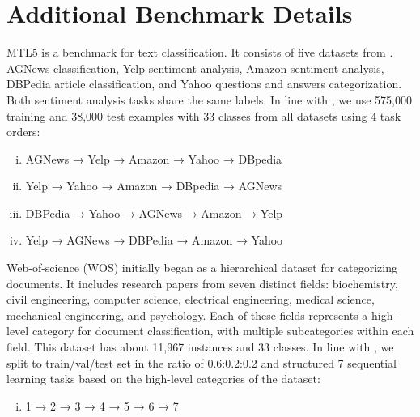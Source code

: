 \documentclass[11pt]{article}
\begin{document}
\clearpage

\appendix

\section{Additional Benchmark Details}
\label{sec:appendix:data}

MTL5 is a benchmark for text classification. It consists of five datasets from \citep{NIPS2015_250cf8b5}. AGNews classification, Yelp sentiment analysis, Amazon sentiment analysis, DBPedia article classification, and Yahoo questions and answers categorization. Both sentiment analysis tasks share the same labels. In line with \citet{NEURIPS2019_f8d2e80c}, we use 575,000 training and 38,000 test examples with 33 classes from all datasets using 4 task orders:

\begin{enumerate}[(i)]
    \small
    \itemsep-0.25em
    \item AGNews → Yelp → Amazon → Yahoo → DBpedia
    \item Yelp → Yahoo → Amazon → DBpedia → AGNews
    \item DBPedia → Yahoo → AGNews → Amazon → Yelp
    \item Yelp → AGNews → DBPedia → Amazon → Yahoo
\end{enumerate}

Web-of-science (WOS) \cite{8260658} initially began as a hierarchical dataset for categorizing documents. It includes research papers from seven distinct fields: biochemistry, civil engineering, computer science, electrical engineering, medical science, mechanical engineering, and psychology. Each of these fields represents a high-level category for document classification, with multiple subcategories within each field. 
This dataset has about 11,967 instances and 33 classes. In line with \citet{wang-etal-2023-rehearsal}, we split to train/val/test set in the ratio of 0.6:0.2:0.2 and structured 7 sequential learning tasks based on the high-level categories of the dataset:

\begin{enumerate}[(i)]
    \small
    \itemsep-0.25em 
    \item 1 → 2 → 3 → 4 → 5 → 6 → 7
\end{enumerate}
\end{document}
